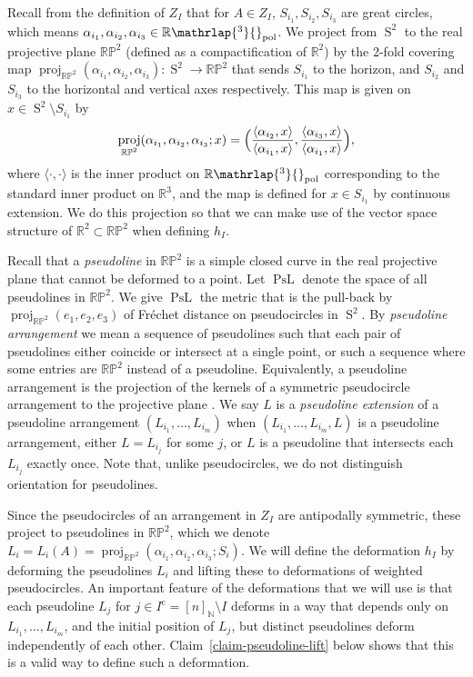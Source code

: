 \documentclass[JEP,XML,SOM,Unicode,NoFloatCountersInSection,published]{cedram}
\theoremstyle{remark}
\let\mb\mathbb
\let\df\emph
\newcommand{\compl}[1]{{{#1}^{\text{c}}}}
\DeclareMathOperator{\sphere}{S}
\newcommand{\Rpol}[1]{\mb{R}\mathrlap{{}^{#1}}{}_\text{pol}}
\DeclareMathOperator{\proj}{proj}
\DeclareMathOperator{\curves}{PsL}
\newcommand{\projplane}{\mb{RP}^2}
\begin{document}
Recall from the definition of $Z_I$ that for $A \in Z_I$, $S_{i_1},S_{i_2},S_{i_3}$ are great circles, which means $\alpha_{i_1}, \alpha_{i_2},\alpha_{i_3} \in \Rpol{3}$.
We project from $\sphere^2$ to the real projective plane $\projplane$ (defined as a compactification of $\mb{R}^2$) by the 2-fold covering map $\proj_{\projplane}(\alpha_{i_1},\alpha_{i_2},\alpha_{i_3}) : \sphere^2 \to \projplane$ that sends $S_{i_1}$ to the horizon, and $S_{i_2}$ and $S_{i_3}$ to the horizontal and vertical axes respectively.
This map is given on $x \in \sphere^2 \setminus S_{i_1}$ by
\[ \proj_{\projplane}(\alpha_{i_1},\alpha_{i_2},\alpha_{i_3}; x) = \Bigl( \frac{\langle \alpha_{i_2}, x \rangle}{\langle \alpha_{i_1}, x \rangle}, \frac{\langle \alpha_{i_3}, x \rangle}{\langle \alpha_{i_1}, x \rangle} \Bigr), \]
where $\langle \cdot,\cdot \rangle$ is the inner product on $\Rpol{3}$ corresponding to the standard inner product on $\mb{R}^3$,
and the map is defined for $x \in S_{i_1}$ by continuous extension.
We do this projection so that we can make use of the vector space structure of $\mb{R}^2 \subset \projplane$ when defining $h_I$.

Recall that a \df{pseudoline} in $\projplane$ is a simple closed curve in the real projective plane that cannot be deformed to a point.
Let $\curves$ denote the space of all pseudolines in $\projplane$.
We give $\curves$ the metric that is the pull-back by $\proj_{\projplane}(e_1,e_2,e_3)$ of Fréchet distance on pseudocircles in $\sphere^2$.
By \df{pseudoline arrangement} we mean a sequence of pseudolines such that each pair of pseudolines either coincide or intersect at a single point, or such a sequence where some entries are $\projplane$ instead of a pseudoline.
Equivalently, a pseudoline arrangement is the projection of the kernels of a symmetric pseudocircle arrangement to the projective plane \cite[\S 6.2]{bjorner1999oriented}.
We say $L$ is a \df{pseudoline extension} of a pseudoline arrangement $(L_{i_1},\dots,L_{i_m})$ when $(L_{i_1},\dots,L_{i_m},L)$ is a pseudoline arrangement, \ie either $L = L_{i_j}$ for some $j$, or $L$ is a pseudoline that intersects each~$L_{i_j}$ exactly once.
Note that, unlike pseudocircles, we do not distinguish orientation for pseudolines.

Since the pseudocircles of an arrangement in $Z_I$ are antipodally symmetric, these project to pseudolines in $\projplane$, which we denote $L_i = L_i(A) = \proj_{\projplane}(\alpha_{i_1},\alpha_{i_2},\alpha_{i_3};S_i)$.
We will define the deformation $h_I$ by deforming the pseudolines $L_i$ and lifting these to deformations of weighted pseudocircles.
An important feature of the deformations that we will use is that each pseudoline $L_j$ for $j \in \compl{I} = [n]_\mb{N} \setminus I$ deforms in a way that depends only on $L_{i_1},\dots,L_{i_m}$, and the initial position of $L_{j}$, but distinct pseudolines deform independently of each other.
Claim~\ref{claim-pseudoline-lift} below shows that this is a valid way to define such a deformation.
\end{document}
